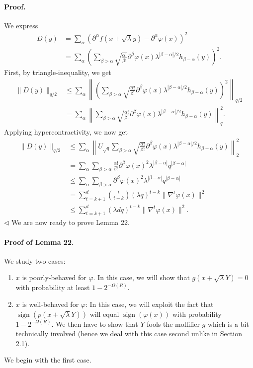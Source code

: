 \documentclass[10pt,a4paper]{article}
\begin{document}
\paragraph{Proof.} We express
\begin{align*}
D(y)&=\sum_\alpha(\partial^\alpha f(x+\sqrt\lambda y)-\partial^\alpha\varphi(x))^2\\
&=\sum_\alpha\left(\sum_{\beta>\alpha}\sqrt{\frac{\alpha!}{\beta!}}\partial^\beta\varphi(x)\lambda^{|\beta-\alpha|/2}h_{\beta-\alpha}(y)\right)^2.
\end{align*}
First, by triangle-inequality, we get
\begin{align*}
\|D(y)\|_{q/2}&\leq\sum_\alpha\left\|\left(\sum_{\beta>\alpha}\sqrt{\frac{\alpha!}{\beta!}}\partial^\beta\varphi(x)\lambda^{|\beta-\alpha|/2}h_{\beta-\alpha}(y)\right)^2\right\|_{q/2}\\
&=\sum_\alpha\left\|\sum_{\beta>\alpha}\sqrt{\frac{\alpha!}{\beta!}}\partial^\beta\varphi(x)\lambda^{|\beta-\alpha|/2}h_{\beta-\alpha}(y)\right\|_q^2.
\end{align*}
Applying hypercontractivity, we now get
\begin{align*}
\|D(y)\|_{q/2}&\leq\sum_\alpha\left\|U_{\sqrt q}\sum_{\beta>\alpha}\sqrt{\frac{\alpha!}{\beta!}}\partial^\beta\varphi(x)\lambda^{|\beta-\alpha|/2}h_{\beta-\alpha}(y)\right\|_2^2\\
&=\sum_\alpha\sum_{\beta>\alpha}\frac{\alpha!}{\beta!}\partial^\beta\varphi(x)^2\lambda^{|\beta-\alpha|}q^{|\beta-\alpha|}\\
&\leq\sum_\alpha\sum_{\beta>\alpha}\partial^\beta\varphi(x)^2\lambda^{|\beta-\alpha|}q^{|\beta-\alpha|}\\
&=\sum_{t=k+1}^d\binom t{t-k}(\lambda q)^{t-k}\|\nabla^t\varphi(x)\|^2\\
&\leq\sum_{t=k+1}^d(\lambda dq)^{t-k}\|\nabla^t\varphi(x)\|^2.
\end{align*}\hfill$\triangleleft$
We are now ready to prove Lemma 22.
\paragraph{Proof of Lemma 22.} We study two cases:
\begin{enumerate}
\item $x$ is poorly-behaved for $\varphi$. In this case, we will show that $g(x+\sqrt\lambda Y)=0$ with probability at least $1-2^{-\Omega(R)}$.
\item $x$ is well-behaved for $\varphi$: In this case, we will exploit the fact that $\operatorname{sign}(p(x+\sqrt\lambda Y))$ will equal $\operatorname{sign}(\varphi(x))$ with probability $1-2^{-\Omega(R)}$. We then have to show that $Y$ fools the mollifier $g$ which is a bit technically involved (hence we deal with this case second unlike in Section 2.1).
\end{enumerate}
We begin with the first case.
\end{document}
